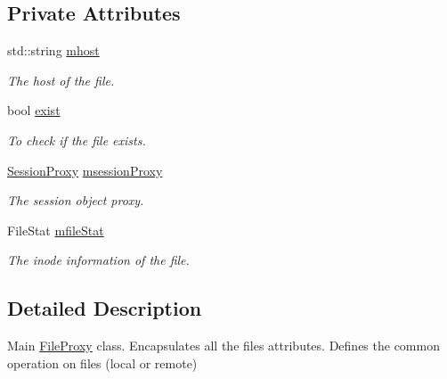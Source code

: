 \subsection*{Private Attributes}
\begin{DoxyCompactItemize}
\item 
\hypertarget{classFileProxy_a1e6cf973d3114c87fdf2d405399bc50f}{
std::string \hyperlink{classFileProxy_a1e6cf973d3114c87fdf2d405399bc50f}{mhost}}
\label{classFileProxy_a1e6cf973d3114c87fdf2d405399bc50f}

\begin{DoxyCompactList}\small\item\em The host of the file. \item\end{DoxyCompactList}\item 
\hypertarget{classFileProxy_a4b0e346c8e0cee89598bb44357703ffa}{
bool \hyperlink{classFileProxy_a4b0e346c8e0cee89598bb44357703ffa}{exist}}
\label{classFileProxy_a4b0e346c8e0cee89598bb44357703ffa}

\begin{DoxyCompactList}\small\item\em To check if the file exists. \item\end{DoxyCompactList}\item 
\hypertarget{classFileProxy_a5e710a1ecc770a0ed775c54601a20563}{
\hyperlink{classSessionProxy}{SessionProxy} \hyperlink{classFileProxy_a5e710a1ecc770a0ed775c54601a20563}{msessionProxy}}
\label{classFileProxy_a5e710a1ecc770a0ed775c54601a20563}

\begin{DoxyCompactList}\small\item\em The session object proxy. \item\end{DoxyCompactList}\item 
\hypertarget{classFileProxy_a661e785a5cb408c60cce534c8b21e64d}{
FileStat \hyperlink{classFileProxy_a661e785a5cb408c60cce534c8b21e64d}{mfileStat}}
\label{classFileProxy_a661e785a5cb408c60cce534c8b21e64d}

\begin{DoxyCompactList}\small\item\em The inode information of the file. \item\end{DoxyCompactList}\end{DoxyCompactItemize}


\subsection{Detailed Description}
Main \hyperlink{classFileProxy}{FileProxy} class. Encapsulates all the files attributes. Defines the common operation on files (local or remote) 

